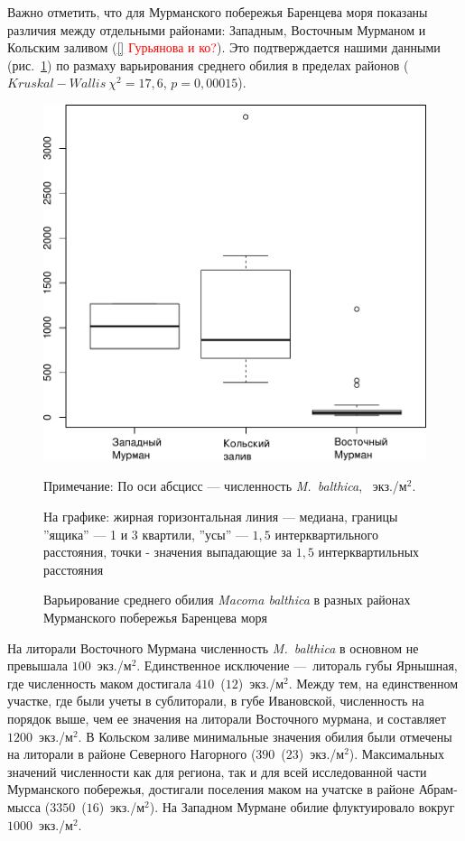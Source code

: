 Важно отметить, что для Мурманского побережья Баренцева моря показаны различия между отдельными районами: Западным, Восточным Мурманом и Кольским заливом (\ref{} \textcolor{red}{Гурьянова и ко?}). 
Это подтверждается нашими данными (рис.~\ref{ris:N_region_Barents}) по размаху варьирования среднего обилия в пределах районов ($Kruskal-Wallis\ \chi^2 = 17,6$, $p = 0,00015$).
%
	\begin{figure}[h]
		\includegraphics{../All_N/Nmean_region_Barents1.pdf}
	\caption{Варьирование среднего обилия {\it Macoma balthica} в разных районах Мурманского побережья Баренцева моря}
	{\footnotesize Примечание: По оси абсцисс --- численность {\it M.~balthica}, ~экз./м$^2$.

	На графике: жирная горизонтальная линия --- медиана, границы ''ящика'' --- 1 и 3 квартили, ''усы'' --- $1,5$ интерквартильного расстояния, точки - значения выпадающие за $1,5$ интерквартильных расстояния}
	\label{ris:N_region_Barents}
	\end{figure}
%
На литорали Восточного Мурмана численность {\it M.~balthica} в основном не превышала $100$~экз./м$^2$. 
Единственное исключение ---\ литораль губы Ярнышная, где численность маком достигала $410$~($12$)~экз./м$^2$. 
Между тем, на единственном участке, где были учеты в сублиторали, в губе Ивановской, численность на порядок выше, чем ее значения на литорали Восточного мурмана, и составляет $1200$~экз./м$^2$. 
В Кольском заливе минимальные значения обилия были отмечены на литорали в районе Северного Нагорного ($390$~($23$)~экз./м$^2$). 
Максимальных значений численности как для региона, так и для всей исследованной части Мурманского побережья, достигали поселения маком на учатске в районе Абрам-мысса ($3350$~($16$)~экз./м$^2$). 
На Западном Мурмане обилие флуктуировало вокруг $1000$~экз./м$^2$.  

